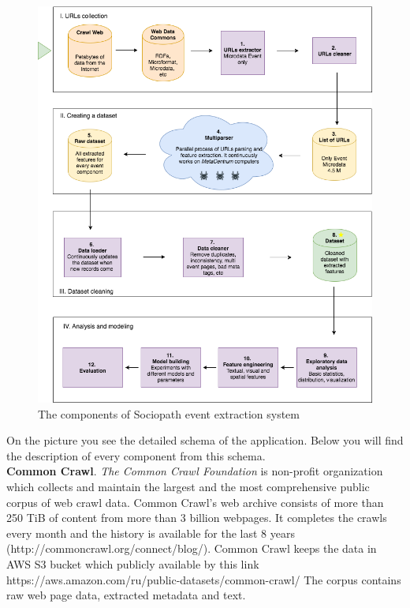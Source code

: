\begin{figure}[h]
\begin{center}
\includegraphics[width=1.0\textwidth]{figures03/Architecure}
\caption{The components of Sociopath event extraction system}
\label{fig:architecture}
\end{center}
\end{figure}

On the picture  you see the detailed schema of the application. Below you will find the description of every component from this schema.\\

\textbf{Common Crawl}. \textit{The Common Crawl Foundation} is non-profit organization which collects and maintain the largest and the most comprehensive public corpus of web crawl data. Common Crawl's web archive consists of more than 250 TiB of content from more than 3 billion webpages. It completes the crawls every month and the history is available for the last 8 years (http://commoncrawl.org/connect/blog/). Common Crawl keeps the data in AWS S3 bucket which publicly available by this link https://aws.amazon.com/ru/public-datasets/common-crawl/  The corpus contains raw web page data, extracted metadata and text. \\

